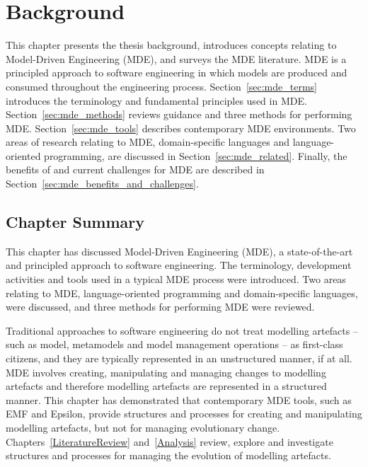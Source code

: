 
\chapter{Background}
\label{Background}
This chapter presents the thesis background, introduces concepts relating to Model-Driven Engineering (MDE), and surveys the MDE literature. MDE is a principled approach to software engineering in which models are produced and consumed throughout the engineering process. Section~\ref{sec:mde_terms} introduces the terminology and fundamental principles used in MDE. Section~\ref{sec:mde_methods} reviews guidance and three methods for performing MDE. Section~\ref{sec:mde_tools} describes contemporary MDE environments. Two areas of research relating to MDE, domain-specific languages and language-oriented programming, are discussed in Section~\ref{sec:mde_related}. Finally, the benefits of and current challenges for MDE are described in Section~\ref{sec:mde_benefits_and_challenges}.







\section{Chapter Summary}
This chapter has discussed Model-Driven Engineering (MDE), a state-of-the-art and principled approach to software engineering. The terminology, development activities and tools used in a typical MDE process were introduced. Two areas relating to MDE, language-oriented programming and domain-specific languages, were discussed, and three methods for performing MDE were reviewed.

Traditional approaches to software engineering do not treat modelling artefacts -- such as model, metamodels and model management operations -- as first-class citizens, and they are typically represented in an unstructured manner, if at all. MDE involves creating, manipulating and managing changes to modelling artefacts and therefore modelling artefacts are represented in a structured manner. This chapter has demonstrated that contemporary MDE tools, such as EMF and Epsilon, provide structures and processes for creating and manipulating modelling artefacts, but not for managing evolutionary change. Chapters~\ref{LiteratureReview} and~\ref{Analysis} review, explore and investigate structures and processes for managing the evolution of modelling artefacts.
